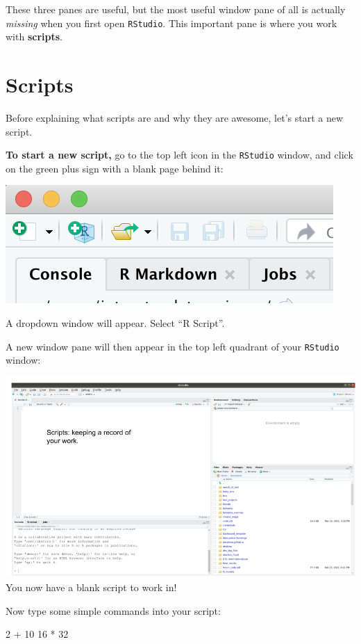 \documentclass[
]{book}
\newenvironment{Shaded}{\begin{snugshade}}{\end{snugshade}}
\newcommand{\DecValTok}[1]{\textcolor[rgb]{0.00,0.00,0.81}{#1}}
\newcommand{\SpecialCharTok}[1]{\textcolor[rgb]{0.00,0.00,0.00}{#1}}
\begin{document}
These three panes are useful, but the most useful window pane of all is actually \emph{missing} when you first open \texttt{RStudio}. This important pane is where you work with \textbf{scripts}.

\hypertarget{scripts}{%
\section*{Scripts}\label{scripts}}

Before explaining what scripts are and why they are awesome, let's start a new script.

\textbf{To start a new script,} go to the top left icon in the \texttt{RStudio} window, and click on the green plus sign with a blank page behind it:

\includegraphics{img/rstudio_newscript.png}

A dropdown window will appear. Select ``R Script''.

A new window pane will then appear in the top left quadrant of your \texttt{RStudio} window:

\includegraphics{img/rstudio_scripts.png}
You now have a blank script to work in!

Now type some simple commands into your script:

\begin{Shaded}
\begin{Highlighting}[]
\DecValTok{2}  \SpecialCharTok{+} \DecValTok{10}
\DecValTok{16} \SpecialCharTok{*} \DecValTok{32}
\end{Highlighting}
\end{Shaded}
\end{document}
